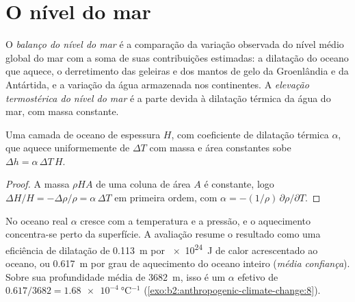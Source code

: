 \section{O nível do mar}\label{sec:b2:anthropogenic-climate-change:sea-level}

\begin{definition}\label{def:b2:anthropogenic-climate-change:sea-level}
O \emph{balanço do nível do mar} é a comparação da variação observada do
nível médio global do mar com a soma de suas contribuições estimadas: a dilatação do oceano que
aquece, o derretimento das geleiras e dos mantos de gelo da Groenlândia e da Antártida, e a variação da
água armazenada nos continentes. A \emph{elevação termostérica do nível do mar} é a
parte devida à dilatação térmica da água do mar, com massa constante.
\end{definition}

\begin{proposition}\label{prop:b2:anthropogenic-climate-change:thermosteric}
Uma camada de oceano de espessura $H$, com coeficiente de dilatação térmica $\alpha$, que aquece uniformemente
de $\Delta T$ com massa e área constantes sobe $\Delta h = \alpha\,\Delta T\,H$.
\end{proposition}
\begin{proof}
A massa $\rho H A$ de uma coluna de área $A$ é constante, logo $\Delta H/H = -\Delta\rho/\rho =
\alpha\,\Delta T$ em primeira ordem, com $\alpha = -(1/\rho)\,\partial\rho/\partial T$.
\end{proof}

No oceano real $\alpha$ cresce com a temperatura e a pressão, e o aquecimento concentra-se perto
da superfície. A avaliação resume o resultado como uma eficiência de dilatação de \qty{0.113}{m} por
\qty{e24}{J} de calor acrescentado ao oceano, ou \qty{0.617}{m} por grau de aquecimento do oceano inteiro
(\emph{média confiança}). Sobre sua profundidade média de \qty{3682}{m}, isso é um $\alpha$ efetivo de
$0.617/3682 = \qty{1.68e-4}{\celsius^{-1}}$ (\cref{exo:b2:anthropogenic-climate-change:8}).

